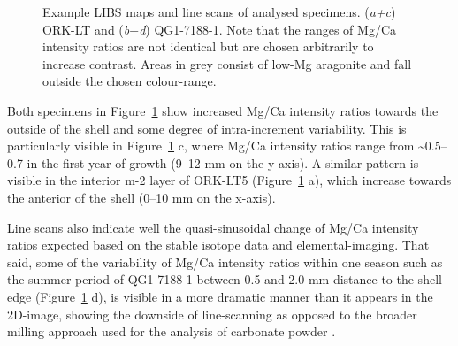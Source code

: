 \documentclass[
  authoryear,
  preprint,
  3p]{elsarticle}
\begin{document}
\begin{figure}[H]


\caption{\label{fig-Pat_LIBS}Example LIBS maps and line scans of
analysed specimens. (\emph{a+c}) ORK-LT and (\emph{b}+\emph{d})
QG1-7188-1. Note that the ranges of Mg/Ca intensity ratios are not
identical but are chosen arbitrarily to increase contrast. Areas in grey
consist of low-Mg aragonite and fall outside the chosen colour-range.}

\end{figure}%

Both specimens in Figure~\ref{fig-Pat_LIBS} show increased Mg/Ca
intensity ratios towards the outside of the shell and some degree of
intra-increment variability. This is particularly visible in
Figure~\ref{fig-Pat_LIBS} c, where Mg/Ca intensity ratios range from
\textasciitilde0.5--0.7 in the first year of growth (9--12 mm on the
y-axis). A similar pattern is visible in the interior m-2 layer of
ORK-LT5 (Figure~\ref{fig-Pat_LIBS} a), which increase towards the
anterior of the shell (0--10 mm on the x-axis).

Line scans also indicate well the quasi-sinusoidal change of Mg/Ca
intensity ratios expected based on the stable isotope data and
elemental-imaging. That said, some of the variability of Mg/Ca intensity
ratios within one season such as the summer period of QG1-7188-1 between
0.5 and 2.0 mm distance to the shell edge (Figure~\ref{fig-Pat_LIBS} d),
is visible in a more dramatic manner than it appears in the 2D-image,
showing the downside of line-scanning as opposed to the broader milling
approach used for the analysis of carbonate powder
\citep{Ferguson2011-zl}.
\end{document}

